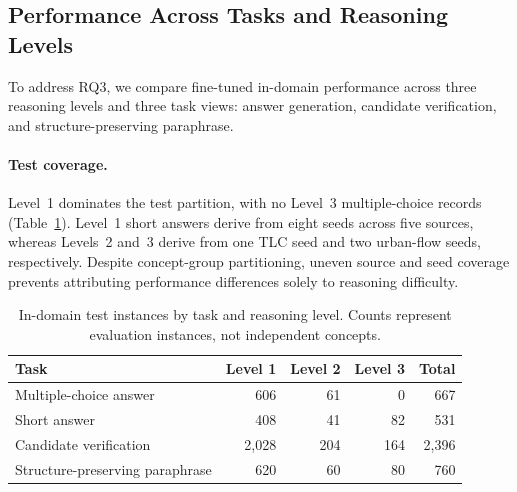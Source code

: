 \documentclass[a4paper,fleqn]{cas-sc}
\begin{document}


\subsection{Performance Across Tasks and Reasoning Levels}
\label{sec:task_difficulty_results}

To address RQ3, we compare fine-tuned in-domain performance across three reasoning levels and three task views: answer generation, candidate verification, and structure-preserving paraphrase.

\paragraph{Test coverage.}
Level~1 dominates the test partition, with no Level~3 multiple-choice records (Table~\ref{tab:task_level_coverage}). Level~1 short answers derive from eight seeds across five sources, whereas Levels~2 and~3 derive from one TLC seed and two urban-flow seeds, respectively. Despite concept-group partitioning, uneven source and seed coverage prevents attributing performance differences solely to reasoning difficulty.

\begin{table}[htbp]
\centering
\small
\caption{In-domain test instances by task and reasoning level. Counts represent evaluation instances, not independent concepts.}
\label{tab:task_level_coverage}
\begin{tabular}{lrrrr}
\toprule
Task & Level 1 & Level 2 & Level 3 & Total \\
\midrule
Multiple-choice answer & 606 & 61 & 0 & 667 \\
Short answer & 408 & 41 & 82 & 531 \\
Candidate verification & 2,028 & 204 & 164 & 2,396 \\
Structure-preserving paraphrase & 620 & 60 & 80 & 760 \\
\bottomrule
\end{tabular}
\end{table}
\end{document}
